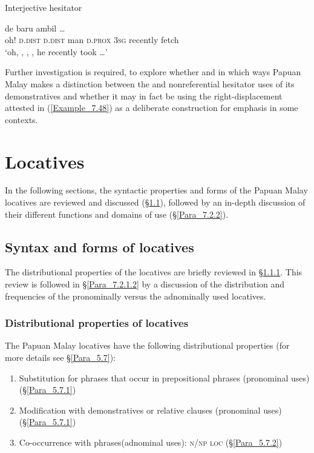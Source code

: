 {\begin{styleExampleTitle}
Interjective hesitator
\end{styleExampleTitle}

\ea
\label{Example_7.48}
 {} {} {} {} {de} {baru} {ambil} {\ldots}\\ %
 oh!  \textsc{d.dist}  \textsc{d.dist}  man  \textsc{d.prox}  \textsc{3sg}  recently  fetch  \\
\glt 
‘oh, , , , he recently took \ldots’ \textstyleExampleSource{[081011-009-Cv.0007]}
\z



Further investigation is required, to explore whether and in which ways Papuan Malay makes a distinction between the  and nonreferential hesitator uses of its demonstratives and whether it may in fact be using the right-displacement attested in (\ref{Example_7.48}) as a deliberate construction for emphasis in some contexts.


\section{Locatives}
\label{Para_7.2}
In the following sections, the syntactic properties and forms of the Papuan Malay locatives are reviewed and discussed (§\ref{Para_7.2.1}), followed by an in-depth discussion of their different functions and domains of use (§\ref{Para_7.2.2}).


\subsection{Syntax and forms of locatives}
\label{Para_7.2.1}
The distributional properties of the locatives are briefly reviewed in §\ref{Para_7.2.1.1}. This review is followed in §\ref{Para_7.2.1.2} by a discussion of the distribution and frequencies of the pronominally versus the adnominally used locatives.


\subsubsection[Distributional properties of locatives]{Distributional properties of locatives}
\label{Para_7.2.1.1}
The Papuan Malay locatives have the following distributional properties (for more details see §\ref{Para_5.7}):



\begin{enumerate}
\item 
Substitution for  phrases that occur in prepositional phrases (pronominal uses) (§\ref{Para_5.7.1})
\item 
Modification with demonstratives or relative clauses (pronominal uses) (§\ref{Para_5.7.1})
\item 
Co-occurrence with  phrases(adnominal uses): \textsc{n}/\textsc{np} \textsc{loc} (§\ref{Para_5.7.2})


\end{enumerate}}
